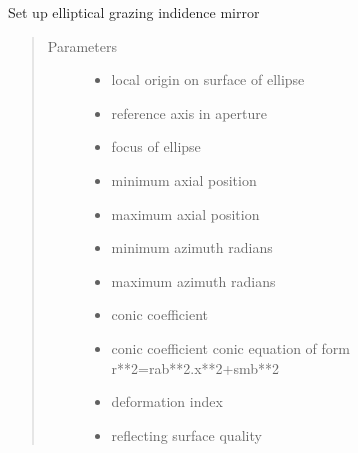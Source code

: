\documentclass[letterpaper,10pt,english]{sphinxmanual}
\begin{document}

\begin{fulllineitems}
\label{\detokenize{xsrt_functions:xsrt.elips}}
Set up elliptical grazing indidence mirror
\begin{quote}\begin{description}
\item[{Parameters}] \leavevmode\begin{itemize}
\item {} 
 \textendash{} local origin on surface of ellipse

\item {} 
 \textendash{} reference axis in aperture

\item {} 
 \textendash{} focus of ellipse

\item {} 
 \textendash{} minimum axial position

\item {} 
 \textendash{} maximum axial position

\item {} 
 \textendash{} minimum azimuth radians

\item {} 
 \textendash{} maximum azimuth radians

\item {} 
 \textendash{} conic coefficient

\item {} 
 \textendash{} conic coefficient
conic equation of form r**2=rab**2.x**2+smb**2

\item {} 
 \textendash{} deformation index

\item {} 
 \textendash{} reflecting surface quality

\end{itemize}

\end{description}\end{quote}

\end{fulllineitems}
\end{document}
